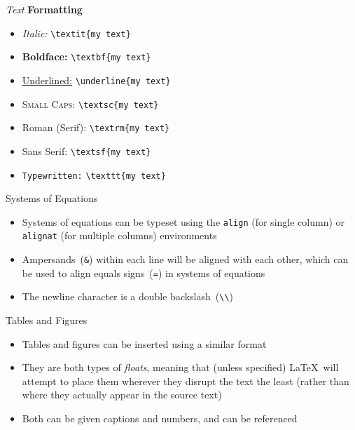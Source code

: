 \documentclass{beamer} %
\begin{document}
\begin{frame}{\textit{Text} \textbf{Formatting}}

\begin{itemize}
	\item \textit{Italic:} {\tt \textbackslash textit\{my text\}}
	\item \textbf{Boldface:} {\tt \textbackslash textbf\{my text\}}
	\item \underline{Underlined:} {\tt \textbackslash underline\{my text\}}
	\item \textsc{Small Caps:} {\tt \textbackslash textsc\{my text\}}
	\item \textrm{Roman (Serif):} {\tt \textbackslash textrm\{my text\}}
	\item \textsf{Sans Serif:} {\tt \textbackslash textsf\{my text\}}
	\item \texttt{Typewritten:} {\tt \textbackslash texttt\{my text\}}
\end{itemize}

\end{frame}

\begin{frame}{Systems of Equations}

\begin{itemize}
	\item Systems of equations can be typeset using the \texttt{align} (for single column) or \texttt{alignat} (for multiple columns) environments
	\item Ampersands~({\tt \&}) within each line will be aligned with each other, which can be used to align equals signs~({\tt =}) in systems of equations
	\item The newline character is a double backslash~({\tt \textbackslash \textbackslash})
\end{itemize}

\end{frame}

\begin{frame}{Tables and Figures}

\begin{itemize}
	\item Tables and figures can be inserted using a similar format
	\item They are both types of \textit{floats}, meaning that (unless specified) \LaTeX\ will attempt to place them wherever they disrupt the text the least (rather than where they actually appear in the source text)
	\item Both can be given captions and numbers, and can be referenced
\end{itemize}

\end{frame}
\end{document}
